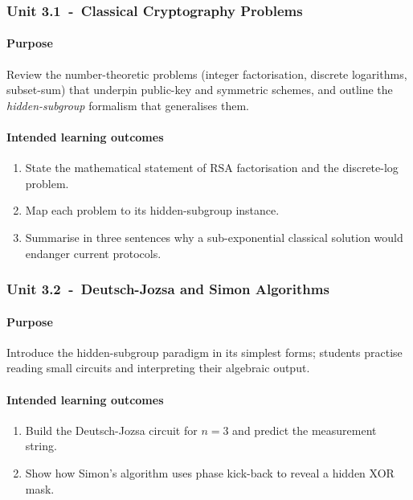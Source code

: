 \subsubsection*{Unit 3.1 - Classical Cryptography Problems}

\paragraph{Purpose}
Review the number-theoretic problems 
(integer factorisation, discrete logarithms, subset-sum) that underpin public-key and symmetric schemes, 
and outline the \emph{hidden-subgroup} formalism that generalises them.

\paragraph{Intended learning outcomes}
\begin{enumerate}[label=3.1-\alph*]
	\item State the mathematical statement of RSA factorisation and the discrete-log problem.                                     
	\item Map each problem to its hidden-subgroup instance.             
	\item Summarise in three sentences why a sub-exponential classical solution would endanger current protocols.                   
\end{enumerate}

\subsubsection*{Unit 3.2 - Deutsch-Jozsa and Simon Algorithms}

\paragraph{Purpose}
Introduce the hidden-subgroup paradigm in its simplest forms; 
students practise reading small circuits and interpreting their algebraic output.

\paragraph{Intended learning outcomes}
\begin{enumerate}[label=3.2-\alph*]
	\item Build the Deutsch-Jozsa circuit for $n=3$ and predict the measurement string.                                          
	\item Show how Simon’s algorithm uses phase kick-back to reveal a hidden XOR mask.                                             
\end{enumerate}

